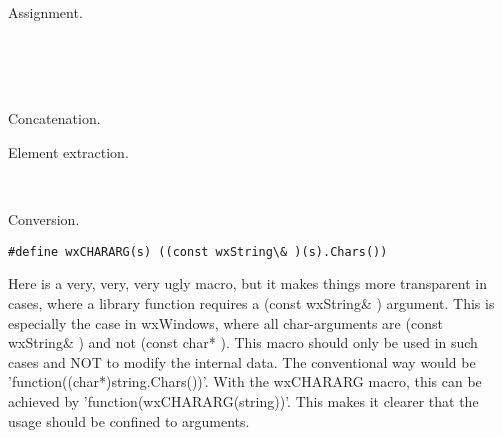 Assignment.
 
\label{wxstringPlusEqual}

\\
\\
\\

Concatenation.

\label{wxstringoperatorbracket}


Element extraction.

\label{wxstringoperatorparenth}


\label{wxstringoperatorout}
\\

\label{wxstringoperatorin}

\label{wxstringoperatorconstcharpt}

Conversion.

\label{wxstringwxCHARARG}

\begin{verbatim}
#define wxCHARARG(s) ((const wxString\& )(s).Chars())  
\end{verbatim}

Here is a very, very, very ugly macro, but it makes things more
transparent in cases, where a library function requires a 
(const wxString\& ) argument. This is especially the case in wxWindows,
where all char-arguments are (const wxString\& ) and not (const char* ).
This macro should only be used in such cases and NOT to
modify the internal data.
The conventional way would be 'function((char*)string.Chars())'.
With the wxCHARARG macro, this can be achieved by 'function(wxCHARARG(string))'.
This makes it clearer that the usage should be confined
to arguments.

